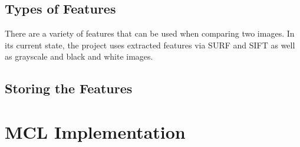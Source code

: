 \documentclass[a4paper,11pt]{article}
\begin{document}
  \subsection{Types of Features}
  There are a variety of features that can be used when comparing two images. In its current state, the project uses extracted features via SURF and SIFT as well as grayscale and black and white images.

  \subsection{Storing the Features}









  \section{MCL Implementation}
   
  








  
\end{document}

